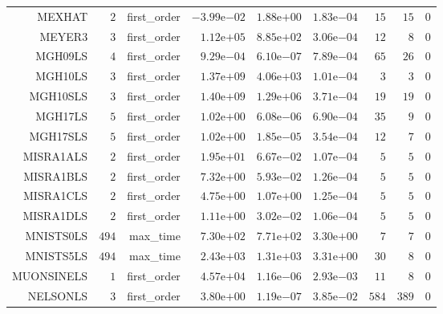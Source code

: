 \begin{longtable}{rrrrrrrrr}
MEXHAT & \(     2\) & first\_order & \(-3.99\)e\(-02\) & \( 1.88\)e\(+00\) & \( 1.83\)e\(-04\) & \(    15\) & \(    15\) & \(     0\) \\
MEYER3 & \(     3\) & first\_order & \( 1.12\)e\(+05\) & \( 8.85\)e\(+02\) & \( 3.06\)e\(-04\) & \(    12\) & \(     8\) & \(     0\) \\
MGH09LS & \(     4\) & first\_order & \( 9.29\)e\(-04\) & \( 6.10\)e\(-07\) & \( 7.89\)e\(-04\) & \(    65\) & \(    26\) & \(     0\) \\
MGH10LS & \(     3\) & first\_order & \( 1.37\)e\(+09\) & \( 4.06\)e\(+03\) & \( 1.01\)e\(-04\) & \(     3\) & \(     3\) & \(     0\) \\
MGH10SLS & \(     3\) & first\_order & \( 1.40\)e\(+09\) & \( 1.29\)e\(+06\) & \( 3.71\)e\(-04\) & \(    19\) & \(    19\) & \(     0\) \\
MGH17LS & \(     5\) & first\_order & \( 1.02\)e\(+00\) & \( 6.08\)e\(-06\) & \( 6.90\)e\(-04\) & \(    35\) & \(     9\) & \(     0\) \\
MGH17SLS & \(     5\) & first\_order & \( 1.02\)e\(+00\) & \( 1.85\)e\(-05\) & \( 3.54\)e\(-04\) & \(    12\) & \(     7\) & \(     0\) \\
MISRA1ALS & \(     2\) & first\_order & \( 1.95\)e\(+01\) & \( 6.67\)e\(-02\) & \( 1.07\)e\(-04\) & \(     5\) & \(     5\) & \(     0\) \\
MISRA1BLS & \(     2\) & first\_order & \( 7.32\)e\(+00\) & \( 5.93\)e\(-02\) & \( 1.26\)e\(-04\) & \(     5\) & \(     5\) & \(     0\) \\
MISRA1CLS & \(     2\) & first\_order & \( 4.75\)e\(+00\) & \( 1.07\)e\(+00\) & \( 1.25\)e\(-04\) & \(     5\) & \(     5\) & \(     0\) \\
MISRA1DLS & \(     2\) & first\_order & \( 1.11\)e\(+00\) & \( 3.02\)e\(-02\) & \( 1.06\)e\(-04\) & \(     5\) & \(     5\) & \(     0\) \\
MNISTS0LS & \(   494\) & max\_time & \( 7.30\)e\(+02\) & \( 7.71\)e\(+02\) & \( 3.30\)e\(+00\) & \(     7\) & \(     7\) & \(     0\) \\
MNISTS5LS & \(   494\) & max\_time & \( 2.43\)e\(+03\) & \( 1.31\)e\(+03\) & \( 3.31\)e\(+00\) & \(    30\) & \(     8\) & \(     0\) \\
MUONSINELS & \(     1\) & first\_order & \( 4.57\)e\(+04\) & \( 1.16\)e\(-06\) & \( 2.93\)e\(-03\) & \(    11\) & \(     8\) & \(     0\) \\
NELSONLS & \(     3\) & first\_order & \( 3.80\)e\(+00\) & \( 1.19\)e\(-07\) & \( 3.85\)e\(-02\) & \(   584\) & \(   389\) & \(     0\) \\

\end{longtable}
